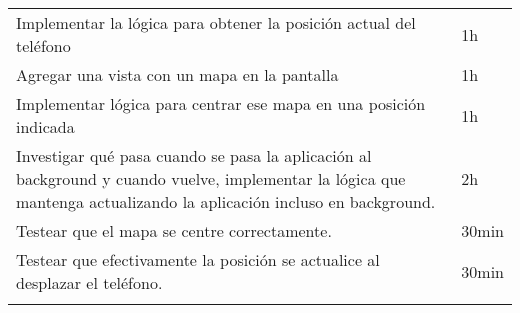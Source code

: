 \begin{enumerate}
\begin{longtable}[c]{@{}ll@{}}
\begin{minipage}[t]{0.92\columnwidth}
  Implementar la lógica para obtener la posición actual del teléfono
  \end{minipage} & \begin{minipage}[t]{0.08\columnwidth}\raggedright
  1h
  \end{minipage}
  \\\noalign{\medskip}
  \begin{minipage}[t]{0.92\columnwidth}\raggedright
  Agregar una vista con un mapa en la pantalla
  \end{minipage} & \begin{minipage}[t]{0.08\columnwidth}\raggedright
  1h
  \end{minipage}
  \\\noalign{\medskip}
  \begin{minipage}[t]{0.92\columnwidth}\raggedright
  Implementar lógica para centrar ese mapa en una posición indicada
  \end{minipage} & \begin{minipage}[t]{0.08\columnwidth}\raggedright
  1h
  \end{minipage}
  \\\noalign{\medskip}
  \begin{minipage}[t]{0.92\columnwidth}\raggedright
  Investigar qué pasa cuando se pasa la aplicación al background y
  cuando vuelve, implementar la lógica que mantenga actualizando la
  aplicación incluso en background.
  \end{minipage} & \begin{minipage}[t]{0.08\columnwidth}\raggedright
  2h
  \end{minipage}
  \\\noalign{\medskip}
  \begin{minipage}[t]{0.92\columnwidth}\raggedright
  Testear que el mapa se centre correctamente.
  \end{minipage} & \begin{minipage}[t]{0.08\columnwidth}\raggedright
  30min
  \end{minipage}
  \\\noalign{\medskip}
  \begin{minipage}[t]{0.92\columnwidth}\raggedright
  Testear que efectivamente la posición se actualice al desplazar el
  teléfono.
  \end{minipage} & \begin{minipage}[t]{0.08\columnwidth}\raggedright
  30min
  \end{minipage}
  \\\noalign{\medskip}
  \begin{minipage}[t]{0.92\columnwidth}\raggedright

\end{minipage}
\end{longtable}
\end{enumerate}
